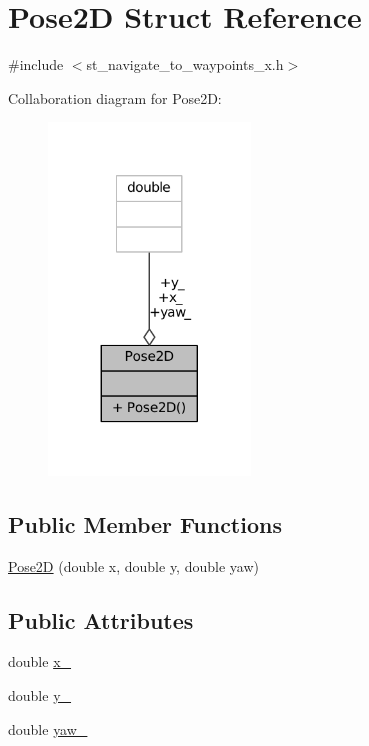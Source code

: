 \hypertarget{structPose2D}{}\section{Pose2D Struct Reference}
\label{structPose2D}


{\ttfamily \#include $<$st\+\_\+navigate\+\_\+to\+\_\+waypoints\+\_\+x.\+h$>$}



Collaboration diagram for Pose2D\+:
\nopagebreak
\begin{figure}[H]
\begin{center}
\leavevmode
\includegraphics[width=152pt]{structPose2D__coll__graph}
\end{center}
\end{figure}
\subsection*{Public Member Functions}
\begin{DoxyCompactItemize}
\item 
\hyperlink{structPose2D_a6b3a01fc654d552596fe441d5bd5c92e}{Pose2D} (double x, double y, double yaw)
\end{DoxyCompactItemize}
\subsection*{Public Attributes}
\begin{DoxyCompactItemize}
\item 
double \hyperlink{structPose2D_aa2f5bc59808d11d801e6b58f57fdd3aa}{x\+\_\+}
\item 
double \hyperlink{structPose2D_a2c31f84b294702b4a82a2c9f44451d54}{y\+\_\+}
\item 
double \hyperlink{structPose2D_a3f0f263a49f611369bcfb06ca9cd5a4d}{yaw\+\_\+}
\end{DoxyCompactItemize}


